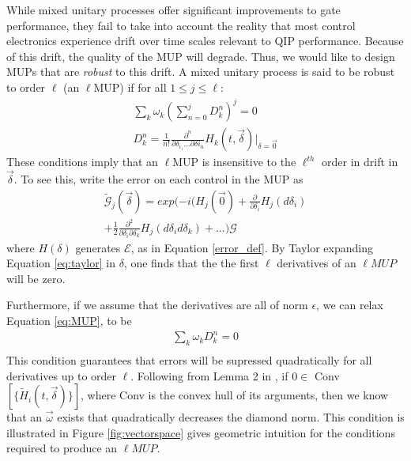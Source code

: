 \documentclass[aps,nofootinbib,pra,notitlepage,twocolumn]{revtex4-1}
\newcommand{\actual}{\ensuremath{\tilde{\mathcal{G}}}}
\newcommand{\target}{\ensuremath{{\mathcal{G}}}}
\newcommand{\error}{\ensuremath{{\mathcal{E}}}}
\begin{document}
While mixed unitary processes offer significant improvements to gate performance, they fail to take into account the reality that most control electronics experience drift over time scales relevant to QIP performance. Because of this drift, the quality of the MUP will degrade. Thus, we would like to design MUPs that are \textit{robust} to this drift. A mixed unitary process is said to be robust to order $\ell$ (an $\ell$MUP) if for all $1 \leq j \leq \ell$:
\begin{equation}\label{eq:MUP}
\begin{gathered}
\sum_k\omega_k(\sum_{n=0}^j D^n_k)^j = 0\\
D^n_k = \frac{1}{n!}\frac{\partial^{n}}{\partial\delta_{i_1}...\partial\delta{i_n}}H_k(t,\vec{\delta})|_{\delta=\vec{0}}
\end{gathered}
\end{equation}
These conditions imply that an $\ell$MUP is insensitive to the $\ell^{th}$ order in drift in $\vec{\delta}$. To see this, write the error on each control in the MUP as 
\begin{equation}\label{eq:taylor}
\begin{gathered}
\actual_j(\vec{\delta}) = exp(-i(H_j(\vec{0}) + \frac{\partial}{\partial\delta_i}H_j(d\delta_i)\\ +  \frac{1}{2}\frac{\partial^2}{\partial\delta_i\partial\delta_k} H_j(d\delta_i d\delta_k) + ...)\target
\end{gathered}
\end{equation}
where $H(\delta)$ generates $\error$, as in Equation \ref{error_def}. By Taylor expanding Equation \ref{eq:taylor} in $\delta$, one finds that the the first $\ell$ derivatives of an $\ell MUP$ will be zero.

Furthermore, if we assume that the derivatives are all of norm $\epsilon$, we can relax Equation \ref{eq:MUP}, to be
\begin{equation}\label{eq:MUP-relaxed}
\begin{gathered}
\sum_k\omega_kD^n_k = 0\\
\end{gathered}
\end{equation}
This condition guarantees that errors will be supressed quadratically for all derivatives up to order $\ell$. Following from Lemma 2 in \cite{Campbell2017}, if $0\in $ Conv$[\{\tilde{H}_i(t, \vec{\delta})\}]$, where Conv is the convex hull of its arguments, then we know that an $\vec{\omega}$ exists that quadratically decreases the diamond norm. This condition is illustrated in Figure \ref{fig:vectorspace} gives geometric intuition for the conditions required to produce an $\ell MUP$.
\end{document}
